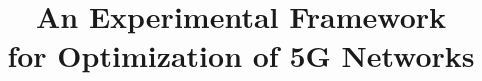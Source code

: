 \documentclass[conference]{IEEEtran}
\begin{document}
%
\title{An Experimental Framework \\for Optimization of 5G Networks}







\end{document}
